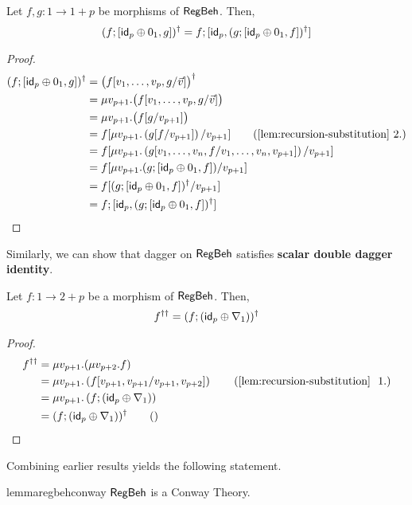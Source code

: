 \begin{lemma}\label{conway2}
Let $f,g \colon 1 \to 1 + p$ be morphisms of $\mathsf{RegBeh}$. Then,
		$$
		(f ; [  \mathsf{id}_p \oplus 0_1 , g ])^\dagger = f ; [ \mathsf{id}_p, (g ;  [  \mathsf{id}_p \oplus 0_1 , f])^\dagger]
		$$ 
\end{lemma}
\begin{proof}
\begin{align*}
(f ; \lc  \id_p \oplus 0_1 , g \rc)^\dagger & = \big(f[v_1,\dots,v_p, g/\vec{v}]\big)^\dagger	
\\
& = \mu v_{p+1}.\big(f[v_1,\dots,v_p, g/\vec{v}]\big)
\\
& = \mu v_{p+1}.\big(f[g/v_{p+1}]\big)
\\
& = f[\mu v_{p+1}. \left(g[f/v_{p+1}]\right)/v_{p+1}] \tag{\Cref{lem:recursion-substitution}~2.}
\\
& = f[\mu v_{p+1}. \left(g[v_1,\dots,v_n,f/v_1,\dots,v_n,v_{p+1}]\right)/v_{p+1}]\\
& = f[\mu v_{p+1}. (g ;  \lc  \id_p \oplus 0_1 , f\rc)/v_{p+1}]
\\
& = f[(g ;  \lc  \id_p \oplus 0_1 , f\rc)^\dagger/v_{p+1}]
\\
& = f ; \lc \id_p, (g ;  \lc  \id_p \oplus 0_1 , f\rc)^\dagger\rc \qedhere
\end{align*}
\end{proof}
Similarly, we can show that dagger on $\mathsf{RegBeh}$ satisfies \textbf{scalar double dagger identity}. 
\begin{lemma}\label{conway3}
Let $f \colon 1 \to 2 + p$ be a morphism of $\mathsf{RegBeh}$. Then,
		$$
		f^{\dagger\dagger} = (f ; (\mathsf{id}_p\oplus \nabla_1))^\dagger
		$$
\end{lemma}
\begin{proof}
\begin{align*}
f^{\dagger\dagger} &= \mu v_{p+1}.(\mu v_{p+2}.f)
\\
& = \mu v_{p+1}. \left(f [v_{p+1}, v_{p+1} / v_{p+1}, v_{p+2}]\right) \tag{\Cref{lem:recursion-substitution}~ 1.}
\\
& = \mu v_{p+1}. \left(f;(\id_p\oplus \nabla_1)\right)
\\
& = (f ; (\id_p\oplus \nabla_1))^\dagger \tag{\hfill\qedhere}
\end{align*}
\end{proof}
Combining earlier results yields the following statement.
\begin{restatable}{lemma}{regbehconway}\label{lem:regbehconway}
$\mathsf{RegBeh}$ is a Conway Theory.	
\end{restatable}

